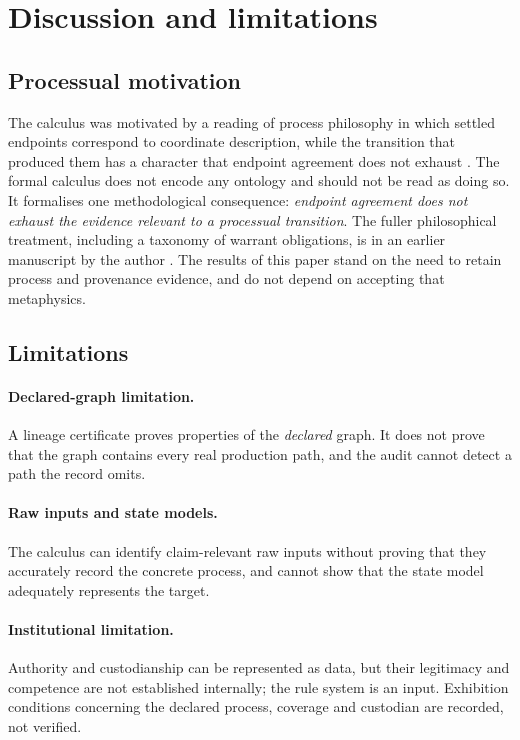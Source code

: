 \section{Discussion and limitations}\label{sec:limitations}

\subsection{Processual motivation}\label{sec:whitehead}
The calculus was motivated by a reading of process philosophy in which settled endpoints correspond to coordinate description, while the transition that produced them has a character that endpoint agreement does not exhaust \cite{whitehead1929}. The formal calculus does not encode any ontology and should not be read as doing so. It formalises one methodological consequence: \emph{endpoint agreement does not exhaust the evidence relevant to a processual transition}. The fuller philosophical treatment, including a taxonomy of warrant obligations, is in an earlier manuscript by the author \cite{moore2026}. The results of this paper stand on the need to retain process and provenance evidence, and do not depend on accepting that metaphysics.

\subsection{Limitations}
\paragraph{Declared-graph limitation.}
A lineage certificate proves properties of the \emph{declared} graph. It does not prove that the graph contains every real production path, and the audit cannot detect a path the record omits.

\paragraph{Raw inputs and state models.}
The calculus can identify claim-relevant raw inputs without proving that they accurately record the concrete process, and cannot show that the state model adequately represents the target.

\paragraph{Institutional limitation.}
Authority and custodianship can be represented as data, but their legitimacy and competence are not established internally; the rule system is an input. Exhibition conditions concerning the declared process, coverage and custodian are recorded, not verified.

